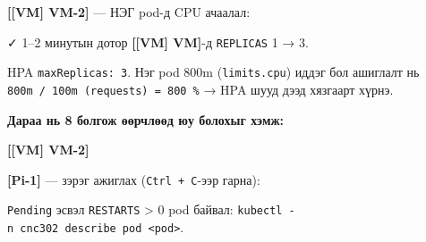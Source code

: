 \begin{Shaded}
\begin{Highlighting}[]
\end{Highlighting}
\end{Shaded}

\textbf{{[}{[}VM{]} VM-2{]}} --- НЭГ pod-д CPU ачаалал:

\begin{Shaded}
\begin{Highlighting}[]
 \KeywordTok{\&}
\end{Highlighting}
\end{Shaded}

✓ 1--2 минутын дотор \textbf{{[}{[}VM{]} VM{]}}-д \texttt{REPLICAS} 1 → 3.

HPA \texttt{maxReplicas:\ 3}. Нэг pod 800m (\texttt{limits.cpu}) иддэг бол ашиглалт нь \texttt{800m\ /\allowbreak{}\ 100m\ (requests)\ =\allowbreak{}\ 800\ \%} → HPA шууд дээд хязгаарт хүрнэ.

\textbf{Дараа нь 8 болгож өөрчлөөд юу болохыг хэмж:}

\textbf{{[}{[}VM{]} VM-2{]}}

\begin{Shaded}
\begin{Highlighting}[]
\KeywordTok{|} 
\end{Highlighting}
\end{Shaded}

\textbf{{[}Pi-1{]}} --- зэрэг ажиглах (\texttt{Ctrl\ +\ C}-ээр гарна):

\begin{Shaded}
\begin{Highlighting}[]
\end{Highlighting}
\end{Shaded}

\texttt{Pending} эсвэл \texttt{RESTARTS} \textgreater{} 0 pod байвал: \texttt{kubectl\ -n\ cnc302\ describe\ pod\ \textless{}pod\textgreater{}}.

